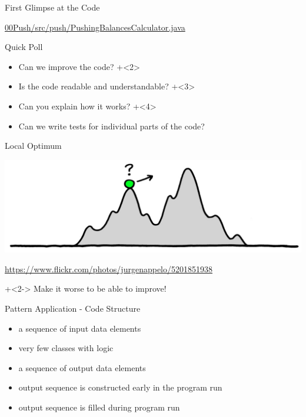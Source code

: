 \begin{frame}[fragile]{First Glimpse at the Code}

\begin{center}
{\large \url{00Push/src/push/PushingBalancesCalculator.java}}
\end{center}
\end{frame}

\begin{frame}[fragile]{Quick Poll}

\begin{itemize}
\onslide+<1>
\item Can we improve the code?
\onslide+<2>
\item Is the code readable and understandable?
\onslide+<3>
\item Can you explain how it works?
\onslide+<4>
\item Can we write tests for individual parts of the code?
\end{itemize}

\end{frame}

\begin{frame}[fragile]{Local Optimum}

{
\begin{center}
\includegraphics[width=\textwidth]{LocalOptimum.jpg}
\end{center}
\vspace{-1.7em}
\hfill \tiny{\url{https://www.flickr.com/photos/jurgenappelo/5201851938}}
}

\onslide+<2->
\vspace{2em}
Make it worse to be able to improve!

\end{frame}

\begin{frame}[fragile]{Pattern Application - Code Structure}

\begin{itemize}
\item a sequence of input data elements
\item very few classes with logic
\item a sequence of output data elements 
\item output sequence is constructed early in the program run
\item output sequence is filled during program run
\end{itemize}

\end{frame}

